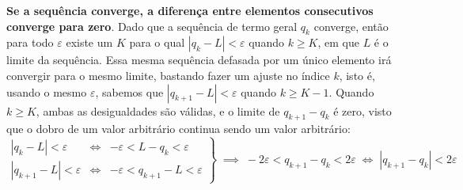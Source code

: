 \textbf{Se a sequência converge,
        a diferença entre elementos consecutivos converge para zero}.
Dado que a sequência de termo geral $q_k$ converge,
então para todo $\varepsilon$ existe um $K$
para o qual $|q_k - L| < \varepsilon$ quando $k \ge K$,
em que $L$ é o limite da sequência.
Essa mesma sequência defasada por um único elemento
irá convergir para o mesmo limite,
bastando fazer um ajuste no índice $k$,
isto é, usando o mesmo $\varepsilon$, sabemos que
$|q_{k+1} - L| < \varepsilon$ quando $k \ge K - 1$.
Quando $k \ge K$, ambas as desigualdades são válidas,
e o limite de $q_{k+1} - q_k$ é zero,
visto que o dobro de um valor arbitrário
continua sendo um valor arbitrário:
\[
  \left.
    \begin{array}{rcl}
        |q_k - L| < \varepsilon
      &\iff&
        - \varepsilon < L - q_k < \varepsilon
      \\
        |q_{k+1} - L| < \varepsilon
      &\iff&
        - \varepsilon < q_{k+1} - L < \varepsilon
    \end{array}
  \right\}
  \;\implies\;
  - 2 \varepsilon < q_{k+1} - q_k < 2 \varepsilon
  \;\iff\;
  |q_{k+1} - q_k| < 2 \varepsilon
\]
